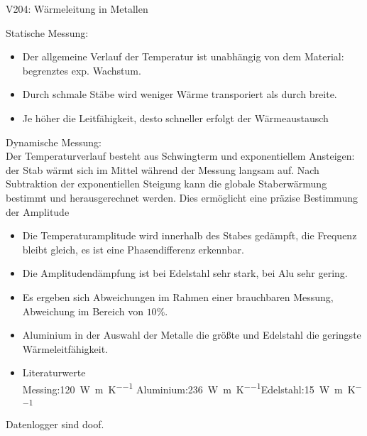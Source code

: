 \begin{Versuch}{V204: Wärmeleitung in Metallen}
        \begin{Auswertung}
        	Statische Messung:
        	\begin{itemize}
        		\item Der allgemeine Verlauf der Temperatur ist unabhängig von dem Material: begrenztes exp. Wachstum.
        		\item Durch schmale Stäbe wird weniger Wärme transporiert als durch breite.
        		\item Je höher die Leitfähigkeit, desto schneller erfolgt der Wärmeaustausch
        	\end{itemize}
        	Dynamische Messung:\\
        	Der Temperaturverlauf besteht aus Schwingterm und exponentiellem Ansteigen: der Stab wärmt sich im Mittel während der Messung langsam auf.
       		Nach Subtraktion der exponentiellen Steigung kann die globale Staberwärmung bestimmt und herausgerechnet werden.
        	Dies ermöglicht eine präzise Bestimmung der Amplitude
        	\begin{itemize}
        		\item Die Temperaturamplitude wird innerhalb des Stabes gedämpft, die Frequenz bleibt gleich, es ist eine Phasendifferenz erkennbar.
        		\item Die Amplitudendämpfung ist bei Edelstahl sehr stark, bei Alu sehr gering.
        	\end{itemize}
        \end{Auswertung}

        \begin{Diskussion}
        	\begin{itemize}
        		\item Es ergeben sich Abweichungen im Rahmen einer brauchbaren Messung, Abweichung im Bereich von $10\%$. 
        		\item Aluminium in der Auswahl der Metalle die größte und Edelstahl die geringste Wärmeleitfähigkeit.
        		\item Literaturwerte\\
        		Messing:\SI{120}{\watt\per\meter\per\kelvin} \quad Aluminium:\SI{236}{\watt\per\meter\per\kelvin}\quad Edelstahl:\SI{15}{\watt\per\meter\per\kelvin}
        	\end{itemize}
            \end{Diskussion}

        \begin{Merke}
        	Datenlogger sind doof.
        \end{Merke}


    \end{Versuch}
    
